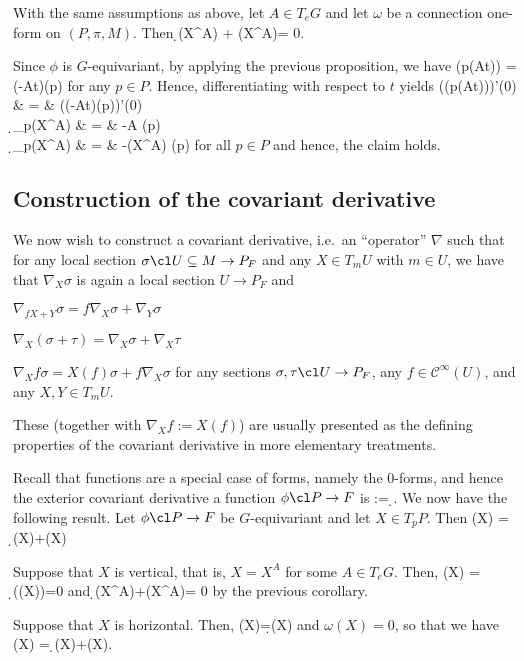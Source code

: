 \bc
With the same assumptions as above, let $A\in T_eG$ and let $\omega$ be a connection one-form on $(P,\pi,M)$. Then
\bse
\d \phi(X^A) + \omega(X^A)\lacts \phi = 0.
\ese
\ec

\bq
Since $\phi$ is $G$-equivariant, by applying the previous proposition, we have
\bse
\phi(p\racts \exp(At)) = \exp(-At)\lacts \phi(p)
\ese
for any $p\in P$. Hence, differentiating with respect to $t$ yields
(\phi(p\racts \exp(At)))'(0) & = & (\exp(-At)\lacts \phi(p))'(0)\\
\d_p\phi(X^A) & = & -A \lacts \phi(p)\\
\d_p\phi(X^A) & = & -\omega(X^A) \lacts \phi(p)
\ei
for all $p\in P$ and hence, the claim holds.
\eq

\subsection{Construction of the covariant derivative}

We now wish to construct a covariant derivative, i.e.\ an ``operator'' $\nabla$ such that for any local section $\sigma \cl U \subseteq M \to P_F$ and any $X\in T_mU$ with $m\in U$, we have that $\nabla_X \sigma$ is again a local section $U\to P_F$ and
\ben[label=\roman*)]
\item $\nabla_{fX+Y}\sigma = f\nabla_{X}\sigma+\nabla_{Y}\sigma$
\item $\nabla_X(\sigma+\tau) = \nabla_X\sigma+\nabla_X\tau$
\item $\nabla_Xf\sigma = X(f)\sigma+f\nabla_X\sigma$
\een
for any sections $\sigma,\tau\cl U\to P_F$, any $f\in \mathcal{C}^{\infty}(U)$, and any $X,Y\in T_mU$.

These (together with $\nabla_Xf:=X(f)$) are usually presented as the defining properties of the covariant derivative in more elementary treatments.

Recall that functions are a special case of forms, namely the $0$-forms, and hence the exterior covariant derivative a function $\phi\cl P\to F$ is
\bse
\D\phi := \d \phi \circ \hor.
\ese
We now have the following result.
\bp
Let $\phi\cl P\to F$ be $G$-equivariant and let $X\in T_pP$. Then
\bse
\D\phi(X) = \d\phi(X)+\omega(X)\lacts \phi
\ese
\ep

\bq
\ben[label=(\alph*)]
\item Suppose that $X$ is vertical, that is, $X=X^A$ for some $A\in T_eG$. Then,
\bse
\D\phi(X) = \d\phi(\hor(X))=0
\ese
and 
\bse
\d\phi(X^A)+\omega(X^A)\lacts \phi = 0
\ese
by the previous corollary.
\item Suppose that $X$ is horizontal. Then,
\bse
\D\phi(X)=\d\phi(X)
\ese
and $\omega(X)=0$, so that we have 
\bse
\D\phi(X) = \d\phi(X)+\omega(X)\lacts \phi.\qedhere
\ese
\een
\eq

